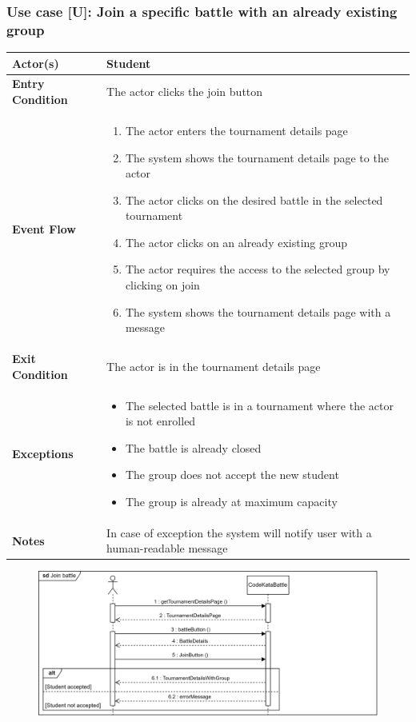 \documentclass[12pt, a4paper]{report}
\newcounter{useCase}
\newcommand{\usecase}[9]{
    \def\arraystretch{1.5} 
    \subsubsection*{Use case [U#2]: #3}
    \vspace*{0.2cm}
    \begin{center}
        \begin{tabular}{|l|p{12cm}|}
            \hline
            \textbf{Actor(s)} & #4 \\
            \hline
            \textbf{Entry Condition} & #5 \\
            \hline
            \textbf{Event Flow} & #6 \\
            \hline
            \textbf{Exit Condition} & #7 \\
            \hline
            \textbf{Exceptions} & #8 \\
            \hline
            \textbf{Notes} & #9 \\
            \hline
        \end{tabular}
    \end{center}
    #1
}
\begin{document}
    \usecase{\begin{figure}[H]\centering\includegraphics[width=0.9\linewidth]{images/joinbattle1.png}\end{figure}}        
    {\arabic{useCase}\stepcounter{useCase}}
    {Join a specific battle with an already existing group}
    {Student}
    {The actor clicks the join button}
    {
    \begin{enumerate}
        \item The actor enters the tournament details page
        \item The system shows the tournament details page to the actor
        \item The actor clicks on the desired battle in the selected tournament
        \item The actor clicks on an already existing group
        \item The actor requires the access to the selected group by clicking on join
        \item The system shows the tournament details page with a message
    \end{enumerate}
    }
    {The actor is in the tournament details page}
    {
    \begin{itemize}
        \item The selected battle is in a tournament where the actor is not enrolled
        \item The battle is already closed
        \item The group does not accept the new student
        \item The group is already at maximum capacity
    \end{itemize}
    }
    {In case of exception the system will notify user with a human-readable message}
\end{document}
